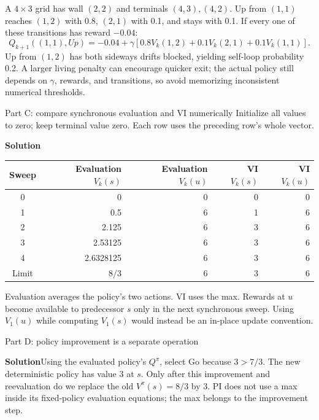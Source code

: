\documentclass[10pt,a4paper]{article}
\newcommand{\ans}{\par\smallskip\textbf{\color{good}Solution\quad}}
\begin{document}
\begin{idea}
A $4\times3$ grid has wall $(2,2)$ and terminals $(4,3),(4,2)$. Up from $(1,1)$ reaches $(1,2)$ with 0.8, $(2,1)$ with 0.1, and stays with 0.1.
If every one of these transitions has reward $-0.04$:
\[
Q_{k+1}((1,1),Up)=-0.04+\gamma[0.8V_k(1,2)+0.1V_k(2,1)+0.1V_k(1,1)].
\]
Up from $(1,2)$ has both sideways drifts blocked, yielding self-loop probability 0.2. A larger living penalty can encourage quicker exit; the actual policy still depends on $\gamma$, rewards, and transitions, so avoid memorizing inconsistent numerical thresholds.
\end{idea}

\begin{question}{Part C: compare synchronous evaluation and VI numerically}
Initialize all values to zero; keep terminal value zero. Each row uses the preceding row's whole vector.
\ans
\begin{center}
\begin{tabular}{@{}crrrr@{}}
\toprule Sweep & Evaluation $V_k(s)$ & Evaluation $V_k(u)$ & VI $V_k(s)$ & VI $V_k(u)$ \\\midrule
0 & 0 & 0 & 0 & 0 \\
1 & 0.5 & 6 & 1 & 6 \\
2 & 2.125 & 6 & 3 & 6 \\
3 & 2.53125 & 6 & 3 & 6 \\
4 & 2.6328125 & 6 & 3 & 6 \\
Limit & $8/3$ & 6 & 3 & 6 \\\bottomrule
\end{tabular}
\end{center}
Evaluation averages the policy's two actions. VI uses the max. Rewards at $u$ become available to predecessor $s$ only in the next synchronous sweep. Using $V_1(u)$ while computing $V_1(s)$ would instead be an in-place update convention.
\end{question}

\begin{question}{Part D: policy improvement is a separate operation}
\ans Using the evaluated policy's $Q^\pi$, select Go because $3>7/3$. The new deterministic policy has value 3 at $s$. Only after this improvement and reevaluation do we replace the old $V^\pi(s)=8/3$ by 3. PI does not use a max inside its fixed-policy evaluation equations; the max belongs to the improvement step.
\end{question}
\end{document}
